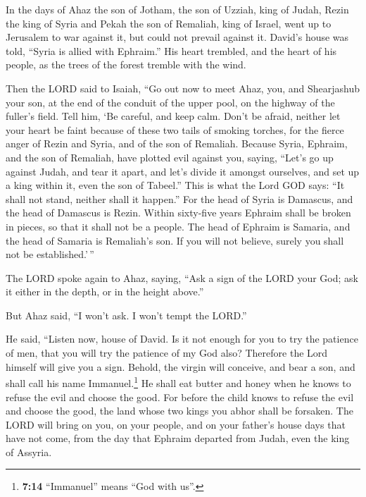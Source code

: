  In the days of Ahaz the son of Jotham, the son of Uzziah,
king of Judah, Rezin the king of Syria and Pekah the son of Remaliah,
king of Israel, went up to Jerusalem to war against it, but could not
prevail against it.  David's house was told, ``Syria is
allied with Ephraim.'' His heart trembled, and the heart of his people,
as the trees of the forest tremble with the wind.

 Then the LORD said to Isaiah, ``Go out now to meet Ahaz,
you, and Shearjashub your son, at the end of the conduit of the upper
pool, on the highway of the fuller's field.  Tell him, `Be
careful, and keep calm. Don't be afraid, neither let your heart be faint
because of these two tails of smoking torches, for the fierce anger of
Rezin and Syria, and of the son of Remaliah.  Because
Syria, Ephraim, and the son of Remaliah, have plotted evil against you,
saying,  ``Let's go up against Judah, and tear it apart,
and let's divide it amongst ourselves, and set up a king within it, even
the son of Tabeel.''  This is what the Lord GOD says: ``It
shall not stand, neither shall it happen.''  For the head
of Syria is Damascus, and the head of Damascus is Rezin. Within
sixty-five years Ephraim shall be broken in pieces, so that it shall not
be a people.  The head of Ephraim is Samaria, and the head
of Samaria is Remaliah's son. If you will not believe, surely you shall
not be established.'\,''

 The LORD spoke again to Ahaz, saying, 
``Ask a sign of the LORD your God; ask it either in the depth, or in the
height above.''

 But Ahaz said, ``I won't ask. I won't tempt the LORD.''

 He said, ``Listen now, house of David. Is it not enough
for you to try the patience of men, that you will try the patience of my
God also?  Therefore the Lord himself will give you a
sign. Behold, the virgin will conceive, and bear a son, and shall call
his name Immanuel.\footnote{\textbf{7:14} ``Immanuel'' means ``God with
  us''.}  He shall eat butter and honey when he knows to
refuse the evil and choose the good.  For before the
child knows to refuse the evil and choose the good, the land whose two
kings you abhor shall be forsaken.  The LORD will bring
on you, on your people, and on your father's house days that have not
come, from the day that Ephraim departed from Judah, even the king of
Assyria.

